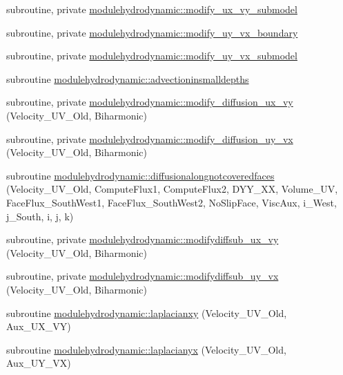 \begin{DoxyCompactItemize}
subroutine, private \mbox{\hyperlink{namespacemodulehydrodynamic_a6396fb9a63198209bc95000bda6ab5fc}{modulehydrodynamic\+::modify\+\_\+ux\+\_\+vy\+\_\+submodel}}
\item 
subroutine, private \mbox{\hyperlink{namespacemodulehydrodynamic_a39fedec790eef204c11688a4105fcfc1}{modulehydrodynamic\+::modify\+\_\+uy\+\_\+vx\+\_\+boundary}}
\item 
subroutine, private \mbox{\hyperlink{namespacemodulehydrodynamic_afcaf5434809b23ffd61b09505bfda4f4}{modulehydrodynamic\+::modify\+\_\+uy\+\_\+vx\+\_\+submodel}}
\item 
subroutine \mbox{\hyperlink{namespacemodulehydrodynamic_afb548a927ee2fd2189deebf674794975}{modulehydrodynamic\+::advectioninsmalldepths}}
\item 
subroutine, private \mbox{\hyperlink{namespacemodulehydrodynamic_a1961c3204e40bc45322afca99ce797ea}{modulehydrodynamic\+::modify\+\_\+diffusion\+\_\+ux\+\_\+vy}} (Velocity\+\_\+\+U\+V\+\_\+\+Old, Biharmonic)
\item 
subroutine, private \mbox{\hyperlink{namespacemodulehydrodynamic_a8bf6e87d87f18ed2725786160a05e8d4}{modulehydrodynamic\+::modify\+\_\+diffusion\+\_\+uy\+\_\+vx}} (Velocity\+\_\+\+U\+V\+\_\+\+Old, Biharmonic)
\item 
subroutine \mbox{\hyperlink{namespacemodulehydrodynamic_ab381daa0e16a21aa8f474a88fc7d11b7}{modulehydrodynamic\+::diffusionalongnotcoveredfaces}} (Velocity\+\_\+\+U\+V\+\_\+\+Old, Compute\+Flux1, Compute\+Flux2, D\+Y\+Y\+\_\+\+XX, Volume\+\_\+\+UV, Face\+Flux\+\_\+\+South\+West1, Face\+Flux\+\_\+\+South\+West2, No\+Slip\+Face, Visc\+Aux, i\+\_\+\+West, j\+\_\+\+South, i, j, k)
\item 
subroutine, private \mbox{\hyperlink{namespacemodulehydrodynamic_a0a591d70830b196d88bbd8d05d6c86f9}{modulehydrodynamic\+::modifydiffsub\+\_\+ux\+\_\+vy}} (Velocity\+\_\+\+U\+V\+\_\+\+Old, Biharmonic)
\item 
subroutine, private \mbox{\hyperlink{namespacemodulehydrodynamic_aa24ecffdbf571df45437d89566a622ae}{modulehydrodynamic\+::modifydiffsub\+\_\+uy\+\_\+vx}} (Velocity\+\_\+\+U\+V\+\_\+\+Old, Biharmonic)
\item 
subroutine \mbox{\hyperlink{namespacemodulehydrodynamic_ace3608af017892be075e4a7361ccedb6}{modulehydrodynamic\+::laplacianxy}} (Velocity\+\_\+\+U\+V\+\_\+\+Old, Aux\+\_\+\+U\+X\+\_\+\+VY)
\item 
subroutine \mbox{\hyperlink{namespacemodulehydrodynamic_a24dd92fa72c14784cca1137f274f1cbd}{modulehydrodynamic\+::laplacianyx}} (Velocity\+\_\+\+U\+V\+\_\+\+Old, Aux\+\_\+\+U\+Y\+\_\+\+VX)

\end{DoxyCompactItemize}
